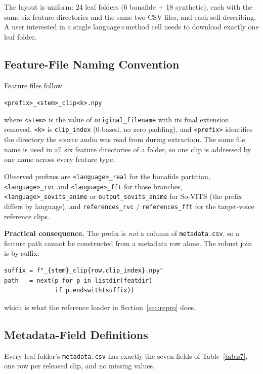 \documentclass[conference]{IEEEtran}
\begin{document}
\noindent The layout is uniform: 24 leaf folders (6 bonafide + 18 synthetic), each with
the same six feature directories and the same two CSV files, and each self-describing.
A user interested in a single language$\times$method cell needs to download exactly one
leaf folder.

\subsection{Feature-File Naming Convention}
\label{sec:naming}
Feature files follow
\begin{center}
\texttt{<prefix>\_<stem>\_clip<k>.npy}
\end{center}
where \texttt{<stem>} is the value of \texttt{original\_filename} with its final
extension removed, \texttt{<k>} is \texttt{clip\_index} (0-based, no zero padding), and
\texttt{<prefix>} identifies the directory the source audio was read from during
extraction. The same file name is used in all six feature directories of a folder, so
one clip is addressed by one name across every feature type.

Observed prefixes are \texttt{<language>\_real} for the bonafide partition,
\texttt{<language>\_rvc} and \texttt{<language>\_fft} for those branches,
\texttt{<language>\_sovits\_anime} or \texttt{output\_sovits\_anime} for So-VITS
(the prefix differs by language), and \texttt{references\_rvc} /
\texttt{references\_fft} for the target-voice reference clips.

\noindent\textbf{Practical consequence.} The prefix is \emph{not} a column of
\texttt{metadata.csv}, so a feature path cannot be constructed from a metadata row alone.
The robust join is by suffix:
\begin{scriptsize}
\begin{verbatim}
suffix = f"_{stem}_clip{row.clip_index}.npy"
path   = next(p for p in listdir(featdir)
              if p.endswith(suffix))
\end{verbatim}
\end{scriptsize}
\noindent which is what the reference loader in Section~\ref{sec:repro} does.

\subsection{Metadata-Field Definitions}
Every leaf folder's \texttt{metadata.csv} has exactly the seven fields of
Table~\ref{tab:s7}, one row per released clip, and no missing values.
\end{document}
